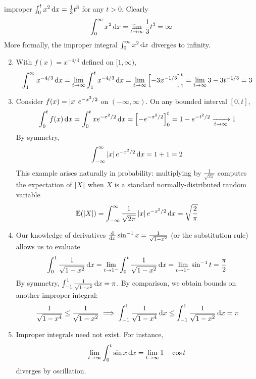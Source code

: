 \begin{examples}{}{improper}
	\exstart $\int_0^tx^2\,{\mathrm{d} x}=\frac 13t^3$ for any $t>0$. Clearly
	\[
		\int_0^\infty x^2\,{\mathrm{d} x}
		=\lim\limits_{t\to\infty}\frac 13t^3 =\infty
	\]
	More formally, the improper integral $\int_0^\infty x^2\,{\mathrm{d} x}$ diverges to infinity.
	
	\begin{enumerate}\setcounter{enumi}{1}
	  \item With $f(x)=x^{-4/3}$ defined on $[1,\infty)$,
	  \[
	  	\int_1^\infty x^{-4/3}\,{\mathrm{d} x}
	  	=\lim_{t\to\infty}\int_1^tx^{-4/3}\,{\mathrm{d} x} 
	  	=\lim_{t\to\infty}\left[-3x^{-1/3}\right]_1^t 
	  	=\lim_{t\to\infty}3-3t^{-1/3} =3
	  \]
	  
	  \item\label{ex:riemannsmotiv} Consider $f(x)=\left| x\right|e^{-x^2/2}$ on $(-\infty,\infty)$. On any bounded interval $[0,t]$,
	  \[
	  	\int_0^tf(x)\,{\mathrm{d} x} =\int_0^t xe^{-x^2/2}\,{\mathrm{d} x} 
	  	=\left[-e^{-x^2/2}\right]_0^t =1-e^{-t^2/2} 
	  	\xrightarrow[t\to\infty]{} 1
	  \]
	  By symmetry,
	  \[
	  	\int_{-\infty}^\infty \left| x\right|e^{-x^2/2}\,{\mathrm{d} x}=1+1=2
	  \]
	  This example arises naturally in probability: multiplying by $\frac 1{\sqrt{2\pi}}$ computes the expectation of $\left| X\right|$ when $X$ is a standard normally-distributed random variable
	  \[
	  	\mathbb{E}(\left| X\right|)=\int_{-\infty}^\infty \frac 1{\sqrt{2\pi}}\left| x\right|e^{-x^2/2}\,{\mathrm{d} x}=\sqrt{\frac 2\pi}
	  \]
	  
	  \item Our knowledge of derivatives $\frac{\mathrm{d} }{\mathrm{d} x}\sin^{-1}x=\frac 1{\sqrt{1-x^2}}$ (or the substitution rule) allows us to evaluate
	  \[
	  	\int_0^1\frac 1{\sqrt{1-x^2}}\,{\mathrm{d} x}
	  	=\lim_{t\to 1^-}\int_0^t\frac 1{\sqrt{1-x^2}}\,{\mathrm{d} x}
	  	=\lim_{t\to 1^-}\sin^{-1}t =\frac\pi 2
	  \]
	  By symmetry, $\int_{-1}^1\frac 1{\sqrt{1-x^2}}\,{\mathrm{d} x}=\pi$. By comparison, we obtain bounds on another improper integral:
	  \[
	  	\frac 1{\sqrt{1-x^4}}\le \frac 1{\sqrt{1-x^2}}
	  	\implies\int_{-1}^1\frac 1{\sqrt{1-x^4}}\,{\mathrm{d} x}
	  	\le \int_{-1}^1\frac 1{\sqrt{1-x^2}}\,{\mathrm{d} x} =\pi
	  \]
	  
	  \item Improper integrals need not exist. For instance,
	  \[
	  	\lim_{t\to\infty}\int_0^t\sin x\,{\mathrm{d} x}
	  	=\lim_{t\to\infty}1-\cos t
	  \]
	  diverges by oscillation.
	\end{enumerate}
\end{examples}

\vfil\vfil\pagebreak

